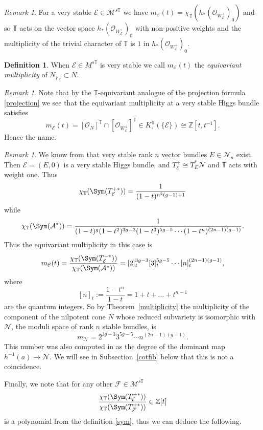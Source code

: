 \documentclass[12pt]{article}
\numberwithin{equation}{section}
\theoremstyle{remark}
\newtheorem{remark}[theorem]{Remark}
\theoremstyle{definition}
\newtheorem{definition}[theorem]{Definition}
\numberwithin{theorem}{section}
\def\beq{\begin{eqnarray}}
\def\eeq{\end{eqnarray}}
\def\calE{{\mathcal E}}
\def\calN{{\mathcal{N}}}
\def\M{{\mathcal{M}}}
\def\calA{{\mathcal{A}}}
\def\calF{{\mathcal{F}}}
\newcommand{\T}{{\mathbb{T}}}
\def\calO{{\mathcal O}}
\def\Z{\mathbb{Z}}
\renewcommand{\1}{\mathbbm{1}}
\begin{document}
\begin{remark} For a very stable $\calE\in \M^{s\T}$ we have $m_{\calE}(t)=\chi_\T(h_*(\calO_{W^+_{\calE}})_0)$ and so $\T$ acts on the vector space $h_*(\calO_{W^+_{\calE}})_0$ with non-positive weights and the multiplicity of the trivial character of $\T$ is $1$ in $h_*(\calO_{W^+_{\calE}})_0$.
	
\end{remark}

\begin{definition} When $\calE\in M^{s\T}$ is very stable we call $m_{\calE}(t)$ the {\em equivariant multiplicity} of $N_{F_\calE}\subset N$. 
\end{definition}
\begin{remark} Note that by the $\T$-equivariant analogue of the projection formula \eqref{projection} we see that the equivariant multiplicity at a very stable Higgs bundle satisfies $$m_{\calE}(t)=[\calO_N]^\T\cap [\calO_{W^+_\calE}]^\T\in K_\circ^\T(\{\calE\})\cong \Z[t,t^{-1}]. $$ Hence the name. 
\end{remark}
\begin{remark} \label{multN}We know from \cite[Proposition 3.5]{laumon} that   very stable rank $n$ vector bundles $E\in \calN_n$ exist.  Then $\calE=(E,0)$ is a very stable Higgs bundle, and $T^+_\calE\cong T^*_E\calN$ and $\T$ acts with weight one. Thus  \beq \label{cotchar}\chi_\T(\Sym(T^{+*}_\calE))={1\over (1-t)^{n^2(g-1)+1}}\eeq  while $$\chi_\T(\Sym(\calA^*))={1\over (1-t)^g(1-t^2)^{3g-3}(1-t^3)^{5g-5}\cdots (1-t^n)^{(2n-1)(g-1)}}.$$ Thus the equivariant multiplicity in this case
	is \beq \label{eqmultN}m_{\calE}(t)={{ \chi_\T(\Sym(T^{+*}_\calE))\over \chi_\T(\Sym(\calA^*))}}=[2]_t^{3g-3}[3]_t^{5g-5}\cdots [{n}]_t^{(2n-1)(g-1)}, \eeq  where $$[n]_t:=\frac{1-t^n}{1-t}=1+t+\dots+t^{n-1}$$ are the quantum integers. So by Theorem~\ref{multiplicity} the multiplicity of the component of the nilpotent cone $N$ whose reduced subvariety is isomorphic with $\calN$, the moduli space of rank $n$ stable bundles, is    $$m_{\calN}=2^{3g-3}3^{5g-5}\cdots n^{(2n-1)(g-1)}.$$ This number was also computed in \cite{beauville-etal} as the degree of the dominant map $h^{-1}(a)\to \calN$.   We will see in Subsection~\ref{cotfib} below that this is not a coincidence.  
	
	Finally, we note that for any other $\calF\in \M^{s\T}$ $${\chi_\T(\Sym(T^{+*}_\calE)) \over \chi_\T(\Sym(T^{+*}_\calF)) }\in \Z[t]$$ is a polynomial from the definition \eqref{sym}, thus we can deduce the following. 
\end{remark}
\end{document}
